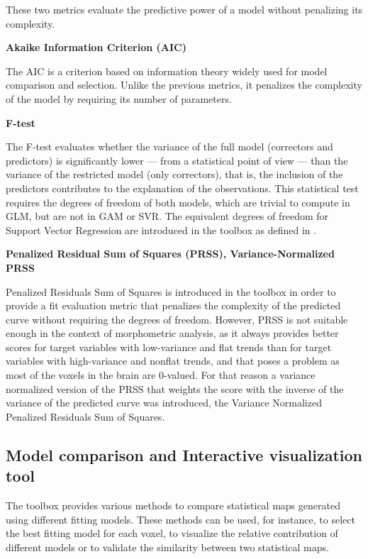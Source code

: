 \documentclass{article}
\begin{document}
These two metrics evaluate the predictive power of a model without penalizing its complexity.

\textbf{Akaike Information Criterion (AIC)}

The AIC is a criterion based on information theory widely used for model comparison and selection. Unlike the previous metrics, it penalizes the complexity of the model by requiring its number of parameters.

\textbf{F-test} 

The F-test evaluates whether the variance of the full model (correctors and predictors) is significantly lower — from a statistical point of view — than the variance of the restricted model (only correctors), that is, the inclusion of the predictors contributes to the explanation of the observations. 
This statistical test requires the degrees of freedom of both models, which are trivial to compute in GLM, but are not in GAM or SVR. The equivalent degrees of freedom for Support Vector Regression are introduced in the toolbox as defined in \cite{equivalent_df_SVR}.

\textbf{Penalized Residual Sum of Squares (PRSS), Variance-Normalized PRSS} 

Penalized Residuals Sum of Squares is introduced in the toolbox in order to provide a fit evaluation metric that penalizes the complexity of the predicted curve without requiring the degrees of freedom. However, PRSS is not suitable enough in the context of morphometric analysis, as it always provides better scores for target variables with low-variance and flat trends than for target variables with high-variance and nonflat trends, and that poses a problem as most of the voxels in the brain are 0-valued.
For that reason a variance normalized version of the PRSS that weights the score with the inverse of the variance of the predicted curve was introduced, the Variance Normalized Penalized Residuals Sum of Squares.

\subsection{Model comparison and Interactive visualization tool}

The toolbox provides various methods to compare statistical maps generated using different fitting models. These methods can be used, for instance, to select the best fitting model for each voxel, to visualize the relative contribution of different models or to validate the similarity between two statistical maps.
\end{document}
